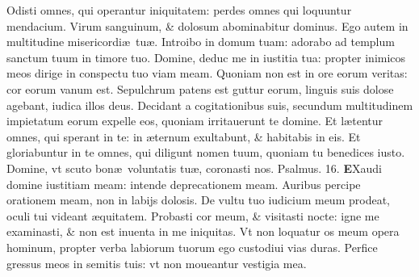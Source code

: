 \documentclass[a5paper,10pt]{book}
\def\ae{æ}
\begin{document}
\begin{multicols*}{2}
\newline \color{red} O\color{black}disti omnes, qui operantur iniquitatem: perdes omnes qui loquuntur mendacium.
\newline \color{red} V\color{black}irum sanguinum, \& dolosum abominabitur dominus.
\newline \color{red} E\color{black}go autem in multitudine misericordi\ae \ tu\ae .
\newline \color{red} I\color{black}ntroibo in domum tuam: adorabo ad templum sanctum tuum in timore tuo.
\newline \color{red} D\color{black}omine, deduc me in iustitia tua: propter inimicos meos dirige in conspectu tuo viam meam.
\newline \color{red} Q\color{black}uoniam non est in ore eorum veritas: cor eorum vanum est.
\newline \color{red} S\color{black}epulchrum patens est guttur eorum, linguis suis dolose agebant, iudica illos deus.
\newline \color{red} D\color{black}ecidant a cogitationibus suis, secundum multitudinem impietatum eorum expelle eos, quoniam irritauerunt te domine.
\newline \color{red} E\color{black}t l\ae tentur omnes, qui sperant in te: in \ae ternum exultabunt, \& habitabis in eis.
\newline \color{red} E\color{black}t gloriabuntur in te omnes, qui diligunt nomen tuum, quoniam tu benedices iusto.
\newline \color{red} D\color{black}omine, vt scuto bon\ae \ voluntatis tu\ae , coronasti nos. \quad \color{red} Psalmus. \hypertarget{ps16}{16.} \color{black}
\vspace{-.5em}
\lettrine[lines=2]{\bfseries \color{red} E}{}Xaudi domine iustitiam meam: intende deprecationem meam.
\newline \color{red} A\color{black}uribus percipe orationem meam, non in labijs dolosis.
\newline \color{red} D\color{black}e vultu tuo iudicium meum prodeat, oculi tui videant \ae quitatem.%
\newline \color{red} P\color{black}robasti cor meum, \& visitasti nocte: igne me examinasti, \& non est inuenta in me iniquitas.
\newline \color{red} V\color{black}t non loquatur os meum opera hominum, propter verba labiorum tuorum ego custodiui vias duras.
\newline \color{red} P\color{black}erfice gressus meos in semitis tuis: vt non moueantur vestigia mea.

\end{multicols*}
\end{document}
